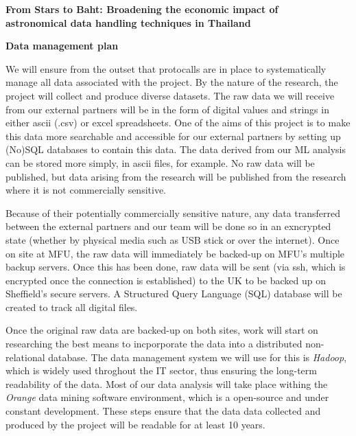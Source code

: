 \documentclass[11pt]{article}
\begin{document}
\setcounter{figure}{0}
\noindent
{\LARGE \bf From Stars to Baht: Broadening the economic impact of \\
astronomical data handling techniques in Thailand}

\vspace{3mm}
\noindent
{\Large \bf Data management plan}

\vspace{2mm}
\noindent
We will ensure from the outset that protocalls are in place to systematically manage all data associated with the project. By the nature of the research, the project will collect and produce diverse datasets. The raw data we will receive from our external partners will be in the form of digital values and strings in either ascii (.csv) or excel spreadsheets. One of the aims of this project is to make this data more searchable and accessible for our external partners by setting up (No)SQL databases to contain this data. The data derived from our ML analysis can be stored more simply, in ascii files, for example. No raw data will be published, but data arising from the research will be published from the research where it is not commercially sensitive.

\vspace{2mm}
\noindent
Because of their potentially commercially sensitive nature, any data transferred between the external partners and our team will be done so in an exncrypted state (whether by physical media such as USB stick or over the internet). Once on site at MFU, the raw data will immediately be backed-up on MFU's multiple backup servers. Once this has been done, raw data will be sent (via ssh, which is encrypted once the connection is established) to the UK to be backed up on Sheffield's secure servers. A Structured Query Language (SQL) database will be created to track all digital files.

\vspace{2mm}
\noindent
Once the original raw data are backed-up on both sites, work will start on researching the best means to incporporate the data into a distributed non-relational database. The data management system we will use for this is {\it Hadoop}, which is widely used throghout the IT sector, thus ensuring the long-term readability of the data. Most of our data analysis will take place withing the {\it Orange} data mining software environment, which is a open-source and under constant development. These steps ensure that the data data collected and produced by the project will be readable for at least 10 years. 
\end{document}
